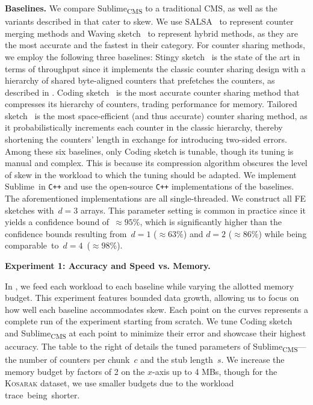 \documentclass[sigconf]{acmart}
\newcommand{\sketch}{Sublime}
\newcommand{\sketchcms}{\sketch\textsubscript{CMS}\xspace}
\begin{document}
\textbf{Baselines.}
We compare \sketchcms to a traditional CMS, as well as the variants described in  that cater to skew.
We use SALSA~\cite{SALSA} to represent counter merging methods and Waving sketch~\cite{WavingSketch} to represent hybrid methods, as they are the most accurate and the fastest in their category.
For counter sharing methods, we employ the following three baselines: Stingy sketch~\cite{StingySketch} is the state of the art in terms of throughput since it implements the classic counter sharing design with a hierarchy of shared byte-aligned counters that prefetches the counters, as described in .
Coding sketch~\cite{CodingSketch} is the most accurate counter sharing method that compresses its hierarchy of counters, trading performance for memory.
Tailored sketch~\cite{TailoredSketch} is the most space-efficient (and thus accurate) counter sharing method, as it probabilistically increments each counter in the classic hierarchy, thereby shortening the counters' length in exchange for introducing two-sided errors.
Among these six baselines, only Coding sketch is tunable, though its tuning is manual and complex.
This is because its compression algorithm obscures the level of skew in the workload to which the tuning should be adapted.
We implement \sketch\ in \texttt{C++} and use the open-source \texttt{C++} implementations of the baselines.
The aforementioned implementations are all single-threaded. We construct all FE sketches with~$d=3$ arrays.
This parameter setting is common in practice since it yields a confidence bound of~$\approx 95\%$, which is significantly higher than the confidence bounds resulting from~$d=1$ ($\approx 63\%$) and $d=2$ ($\approx 86\%$) while being comparable~to~$d=4$~($\approx 98\%$).

\hypertarget{experiment:accuracy}{\textbf{Experiment 1: Accuracy and Speed vs. Memory.}}
In , we feed each workload to each baseline while varying the allotted memory budget.
This experiment features bounded data growth, allowing us to focus on how well each baseline accommodates skew.
Each point on the curves represents a complete run of the experiment starting from scratch.
We tune Coding sketch and \sketchcms at each point to minimize their error and showcase their highest accuracy.
The table to the right of  details the tuned parameters of \sketchcms---the number of counters per chunk~$c$ and the stub length~$s$.
We increase the memory budget by factors of 2 on the $x$-axis up to 4 MBs, though for the \textsc{Kosarak} dataset, we use smaller budgets due to the workload \mbox{trace being shorter}.
\end{document}
